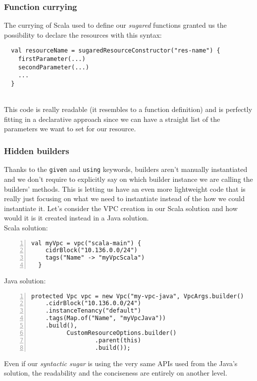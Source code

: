 \subsubsection{Function currying}
The currying of Scala used to define our \textit{sugared} functions granted us the possibility to declare the resources with this syntax:
\begin{verbatim}
  val resourceName = sugaredResourceConstructor("res-name") {
    firstParameter(...)
    secondParameter(...)
    ...
  }
\end{verbatim}\mbox{}\\
This code is really readable (it resembles to a function definition) and is perfectly fitting in a declarative approach since we can have a straight list of the parameters we want to set for our resource.\\

\subsubsection{Hidden builders}
Thanks to the \texttt{given} and \texttt{using} keywords, builders aren't manually instantiated and we don't require to explicitly say on which builder instance we are calling the builders' methods.
This is letting us have an even more lightweight code that is really just focusing on what we need to instantiate instead of the how we could instantiate it.
Let's consider the VPC creation in our Scala solution and how would it is it created instead in a Java solution.\\
Scala solution:\\
\begin{minipage}{\linewidth}
\begin{lstlisting}[numbers=left, numberstyle=\tiny, numbersep=-5pt, stepnumber=1]
  val myVpc = vpc("scala-main") {
    cidrBlock("10.136.0.0/24")
    tags("Name" -> "myVpcScala")
  }
\end{lstlisting}
\end{minipage}
Java solution:\\
\begin{minipage}{\linewidth}
\begin{lstlisting}[numbers=left, numberstyle=\tiny, numbersep=-5pt, stepnumber=1]
  protected Vpc vpc = new Vpc("my-vpc-java", VpcArgs.builder()
    .cidrBlock("10.136.0.0/24")
    .instanceTenancy("default")
    .tags(Map.of("Name", "myVpcJava"))
    .build(),
          CustomResourceOptions.builder()
                  .parent(this)
                  .build());
\end{lstlisting}
\end{minipage}
Even if our \textit{syntactic sugar} is using the very same APIs used from the Java's solution, the readability and the conciseness are entirely on another level.

